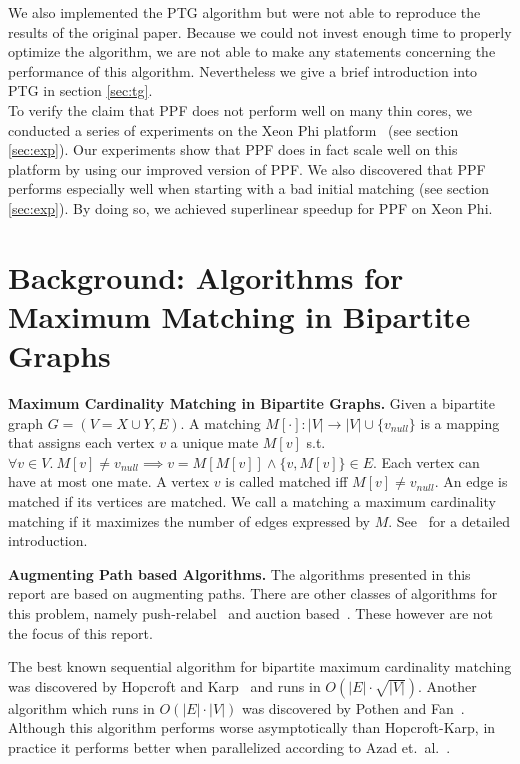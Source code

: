 \documentclass[letterpaper]{article}
\newcommand{\mypar}[1]{{\bf #1.}}
\begin{document}
We also implemented the PTG algorithm but were not able to reproduce the results of the original paper. 
Because we could not invest enough time to properly optimize the algorithm, we are not able to make any statements concerning the performance of this algorithm.
Nevertheless we give a brief introduction into PTG in section \ref{sec:tg}.\\

To verify the claim that PPF does not perform well on many thin cores, we conducted a series of experiments on the Xeon Phi platform~\cite{XeonPhi} (see section \ref{sec:exp}). 
Our experiments show that PPF does in fact scale well on this platform by using our improved version of PPF. We also discovered that PPF
performs especially well when starting with a bad initial matching (see section \ref{sec:exp}). 
By doing so, we achieved superlinear speedup for PPF on Xeon Phi.

\section{Background: Algorithms for Maximum Matching in Bipartite Graphs}\label{sec:background}

\mypar{Maximum Cardinality Matching in Bipartite Graphs}
Given a bipartite graph $G = (V = X \cup Y, E)$.
A matching $M[\cdot]: |V| \rightarrow |V| \cup \{v_{null}\}$ is a mapping that assigns each vertex $v$ a unique mate $M[v]$ s.t. 
$\forall v \in V.\ M[v] \neq v_{null} \implies v = M[M[v]] \wedge \{v, M[v]\} \in E$.
Each vertex can have at most one mate. A vertex $v$ is called matched iff $M[v] \neq v_{null}$. An edge is matched if its vertices are matched. 
We call a matching a maximum cardinality matching if it maximizes the number of edges expressed by $M$. See~\cite{intro_alg} for a detailed introduction.

\mypar{Augmenting Path based Algorithms}
The algorithms presented in this report are based on augmenting paths. 
There are other classes of algorithms for this problem, namely push-relabel~\cite{GoldbergT88} and auction based~\cite{Bertsekas}. 
These however are not the focus of this report. 

The best known sequential algorithm for bipartite maximum cardinality matching was discovered by Hopcroft and Karp~\cite{HK:1973}
and runs in $O(|E|\cdot \sqrt{|V|})$. Another algorithm which runs in $O(|E|\cdot|V|)$ was discovered by Pothen and Fan~\cite{Pothen:1990}.
Although this algorithm performs worse asymptotically than Hopcroft-Karp, in practice it performs better when parallelized according to Azad et.\ al.~\cite{Azad:2012}.
\end{document}
